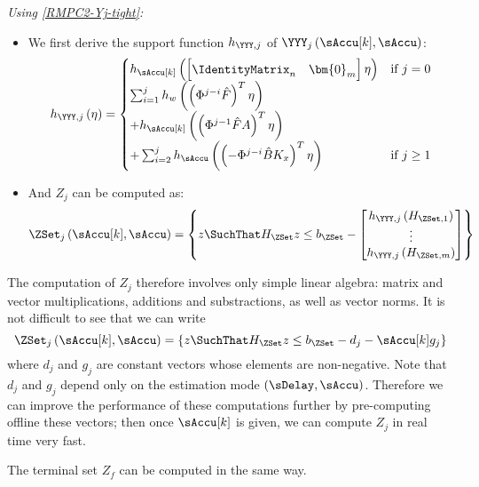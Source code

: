 \noindent\textit{Using \eqref{RMPC2-Yj-tight}:}
\begin{itemize}
\item We first derive the support function $h_{\YYY,j}$ of $\YYY_{j}\left(\sAccu[k],\sAccu\right)$:
{\footnotesize
\begin{equation}
h_{\YYY,j}\left(\eta\right)=\begin{cases}
h_{\sAccu[k]}\left(\begin{bmatrix}\IdentityMatrix_{n} & \bm{0}_{m}\end{bmatrix}\eta\right) & \text{\text{\text{if \ensuremath{j=0}}}}\\
\sum_{i=1}^{j}h_{w}\left(\left(\Phi^{j-i}\hat{F}\right)^{T}\eta\right)\\
+h_{\sAccu[k]}\left(\left(\Phi^{j-1}\hat{F}A\right)^{T}\eta\right)\\ +\sum_{i=2}^{j}h_{\sAccu}\left(\left(-\Phi^{j-i}\hat{B}K_{x}\right)^{T}\eta\right) & \text{if \ensuremath{j\geq1}}
\end{cases}
\end{equation}
}

\item And $Z_{j}$ can be computed as:
\[
\ZSet_{j}\left(\sAccu[k],\sAccu\right)=\left\{ z\SuchThat H_{\ZSet}z\leq b_{\ZSet}-\begin{bmatrix}h_{\YYY,j}\left(H_{\ZSet,1}\right)\\
\vdots\\
h_{\YYY,j}\left(H_{\ZSet,m}\right)
\end{bmatrix}\right\} 
\]

\end{itemize}
The computation of $Z_{j}$ therefore involves only simple linear
algebra: matrix and vector multiplications, additions and substractions,
as well as vector norms. It is not difficult to see that we can write
\begin{equation}
\ZSet_{j}\left(\sAccu[k],\sAccu\right)=\left\{ z\SuchThat H_{\ZSet}z\leq b_{\ZSet}-d_{j}-\sAccu[k]g_{j}\right\} \label{eq:impl-Zj-linear}
\end{equation}
where $d_{j}$ and $g_{j}$ are constant vectors whose elements are
non-negative. Note that $d_{j}$ and $g_{j}$ depend only on the estimation
mode $\left(\sDelay,\sAccu\right)$. Therefore we can improve the
performance of these computations further by pre-computing offline
these vectors; then once $\sAccu[k]$ is given, we can compute $Z_{j}$
in real time very fast.

The terminal set $Z_{f}$ can be computed in the same way.
